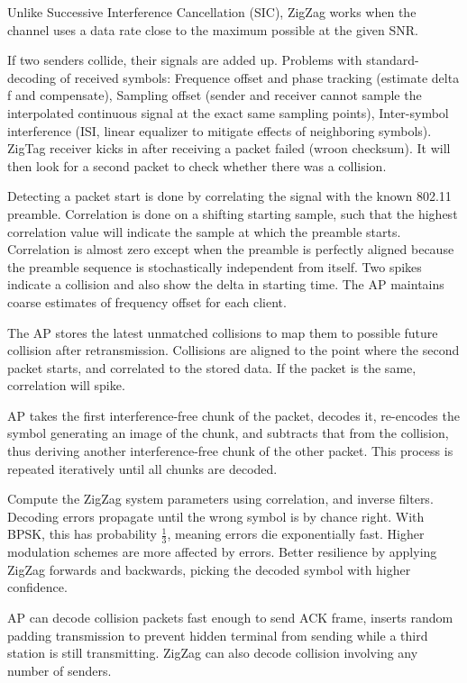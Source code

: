 Unlike Successive Interference Cancellation (SIC), ZigZag works when the channel uses a data rate close to the maximum possible at the given SNR.

If two senders collide, their signals are added up. Problems with standard-decoding of received symbols: Frequence offset and phase tracking (estimate delta f and compensate), Sampling offset (sender and receiver cannot sample the interpolated continuous signal at the exact same sampling points), Inter-symbol interference (ISI, linear equalizer to mitigate effects of neighboring symbols). ZigTag receiver kicks in after receiving a packet failed (wroon checksum).  It will then look for a second packet to check whether there was a collision.

Detecting a packet start is done by correlating the signal with the known 802.11 preamble. Correlation is done on a shifting starting sample, such that the highest correlation value will indicate the sample at which the preamble starts. Correlation is almost zero except when the preamble is perfectly aligned because the preamble sequence is stochastically independent from itself. Two spikes indicate a collision and also show the delta in starting time. The AP maintains coarse estimates of frequency offset for each client.

The AP stores the latest unmatched collisions to map them to possible future collision after retransmission. Collisions are aligned to the point where the second packet starts, and correlated to the stored data. If the packet is the same, correlation will spike.

AP takes the first interference-free chunk of the packet, decodes it, re-encodes the symbol generating an image of the chunk, and subtracts that from the collision, thus deriving another interference-free chunk of the other packet. This process is repeated iteratively until all chunks are decoded.

Compute the ZigZag system parameters using correlation, and inverse filters. Decoding errors propagate until the wrong symbol is by chance right. With BPSK, this has probability $\frac{1}{3}$, meaning errors die exponentially fast. Higher modulation schemes are more affected by errors. Better resilience by applying ZigZag forwards and backwards, picking the decoded symbol with higher confidence.

AP can decode collision packets fast enough to send ACK frame, inserts random padding transmission to prevent hidden terminal from sending while a third station is still transmitting. ZigZag can also decode collision involving any number of senders.


